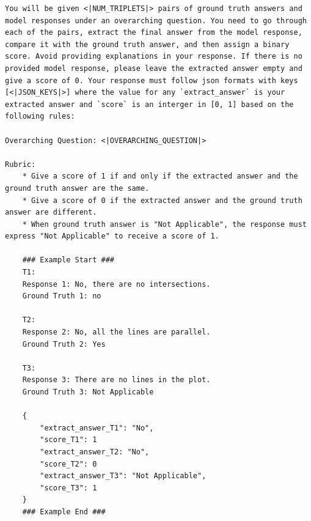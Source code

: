 \newpage
\begin{example}
\begin{lstlisting}
You will be given <|NUM_TRIPLETS|> pairs of ground truth answers and model responses under an overarching question. You need to go through each of the pairs, extract the final answer from the model response, compare it with the ground truth answer, and then assign a binary score. Avoid providing explanations in your response. If there is no provided model response, please leave the extracted answer empty and give a score of 0. Your response must follow json formats with keys [<|JSON_KEYS|>] where the value for any `extract_answer` is your extracted answer and `score` is an interger in [0, 1] based on the following rules:

Overarching Question: <|OVERARCHING_QUESTION|>

Rubric:
    * Give a score of 1 if and only if the extracted answer and the ground truth answer are the same.
    * Give a score of 0 if the extracted answer and the ground truth answer are different.
    * When ground truth answer is "Not Applicable", the response must express "Not Applicable" to receive a score of 1.

    ### Example Start ###
    T1:
    Response 1: No, there are no intersections.
    Ground Truth 1: no

    T2:
    Response 2: No, all the lines are parallel.
    Ground Truth 2: Yes

    T3:
    Response 3: There are no lines in the plot.
    Ground Truth 3: Not Applicable

    {
        "extract_answer_T1": "No",
        "score_T1": 1
        "extract_answer_T2: "No",
        "score_T2": 0
        "extract_answer_T3": "Not Applicable",
        "score_T3": 1
    }
    ### Example End ###   
\end{lstlisting} 
\end{example}

